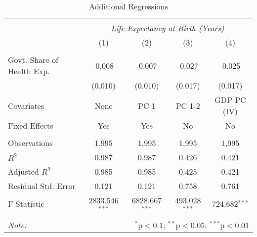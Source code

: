 \begin{table}[!htbp] \centering
  \caption{Additional Regressions \label{additional_regs}}
\begin{tabular}{@{\extracolsep{5pt}}lcccc}
\\[-1.8ex]\hline
\hline \\[-1.8ex]
& \multicolumn{4}{c}{\textit{Life Expectancy at Birth (Years)}} \
\cr \
\\[-1.8ex] & (1) & (2) & (3) & (4) \\
\hline \\[-1.8ex]
 Govt. Share of Health Exp. & -0.008$^{}$ & -0.007$^{}$ & -0.027$^{}$ & -0.025$^{}$ \\
  & (0.010) & (0.010) & (0.017) & (0.017) \\
 Covariates & None & PC 1 & PC 1-2 & GDP PC (IV) \\
 Fixed Effects & Yes & Yes & No & No \\
\hline \\[-1.8ex]
 Observations & 1,995 & 1,995 & 1,995 & 1,995 \\
 $R^2$ & 0.987 & 0.987 & 0.426 & 0.421 \\
 Adjusted $R^2$ & 0.985 & 0.985 & 0.425 & 0.421 \\
 Residual Std. Error & 0.121 & 0.121 & 0.758 & 0.761  \\
 F Statistic & 2833.546$^{***}$  & 6828.667$^{***}$  & 493.028$^{***}$  & 724.682$^{***}$  \\
\hline
\hline \\[-1.8ex]
\textit{Note:} & \multicolumn{4}{r}{$^{*}$p$<$0.1; $^{**}$p$<$0.05; $^{***}$p$<$0.01} \\
\end{tabular}
\end{table}